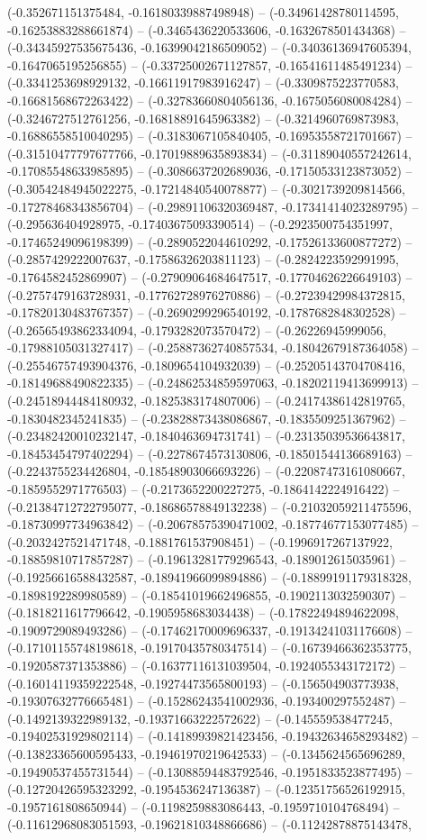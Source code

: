 (-0.352671151375484, -0.16180339887498948) -- (-0.34961428780114595, -0.16253883288661874) -- (-0.3465436220533606, -0.1632678501434368) -- (-0.34345927535675436, -0.16399042186509052) -- (-0.34036136947605394, -0.1647065195256855) -- (-0.33725002671127857, -0.16541611485491234) -- (-0.3341253698929132, -0.16611917983916247) -- (-0.3309875223770583, -0.16681568672263422) -- (-0.32783660804056136, -0.1675056080084284) -- (-0.3246727512761256, -0.16818891645963382) -- (-0.3214960769873983, -0.16886558510040295) -- (-0.3183067105840405, -0.16953558721701667) -- (-0.31510477797677766, -0.17019889635893834) -- (-0.31189040557242614, -0.17085548633985895) -- (-0.3086637202689036, -0.17150533123873052) -- (-0.30542484945022275, -0.17214840540078877) -- (-0.3021739209814566, -0.17278468343856704) -- (-0.29891106320369487, -0.17341414023289795) -- (-0.295636404928975, -0.17403675093390514) -- (-0.2923500754351997, -0.17465249096198399) -- (-0.2890522044610292, -0.17526133600877272) -- (-0.2857429222007637, -0.17586326203811123) -- (-0.2824223592991995, -0.1764582452869907) -- (-0.27909064684647517, -0.17704626226649103) -- (-0.2757479163728931, -0.17762728976270886) -- (-0.27239429984372815, -0.17820130483767357) -- (-0.2690299296540192, -0.1787682848302528) -- (-0.26565493862334094, -0.1793282073570472) -- (-0.26226945999056, -0.17988105031327417) -- (-0.25887362740857534, -0.18042679187364058) -- (-0.25546757493904376, -0.1809654104932039) -- (-0.25205143704708416, -0.18149688490822335) -- (-0.24862534859597063, -0.18202119413699913) -- (-0.24518944484180932, -0.1825383174807006) -- (-0.24174386142819765, -0.1830482345241835) -- (-0.23828873438086867, -0.1835509251367962) -- (-0.23482420010232147, -0.1840463694731741) -- (-0.23135039536643817, -0.18453454797402294) -- (-0.2278674573130806, -0.18501544136689163) -- (-0.2243755234426804, -0.18548903066693226) -- (-0.22087473161080667, -0.1859552971776503) -- (-0.2173652200227275, -0.1864142224916422) -- (-0.21384712722795077, -0.18686578849132238) -- (-0.21032059211475596, -0.18730997734963842) -- (-0.20678575390471002, -0.18774677153077485) -- (-0.2032427521471748, -0.1881761537908451) -- (-0.1996917267137922, -0.18859810717857287) -- (-0.19613281779296543, -0.189012615035961) -- (-0.19256616588432587, -0.18941966099894886) -- (-0.18899191179318328, -0.1898192289980589) -- (-0.18541019662496855, -0.1902113032590307) -- (-0.1818211617796642, -0.1905958683034438) -- (-0.17822494894622098, -0.1909729089493286) -- (-0.17462170009696337, -0.19134241031176608) -- (-0.17101155748198618, -0.19170435780347514) -- (-0.16739466362353775, -0.1920587371353886) -- (-0.16377116131039504, -0.1924055343172172) -- (-0.16014119359222548, -0.19274473565800193) -- (-0.156504903773938, -0.19307632776665481) -- (-0.15286243541002936, -0.193400297552487) -- (-0.1492139322989132, -0.19371663222572622) -- (-0.145559538477245, -0.19402531929802114) -- (-0.14189939821423456, -0.19432634658293482) -- (-0.13823365600595433, -0.19461970219642533) -- (-0.1345624565696289, -0.19490537455731544) -- (-0.13088594483792546, -0.1951833523877495) -- (-0.12720426595323292, -0.1954536247136387) -- (-0.12351756526192915, -0.1957161808650944) -- (-0.1198259883086443, -0.1959710104768494) -- (-0.11612968083051593, -0.19621810348866686) -- (-0.11242878875143478, 